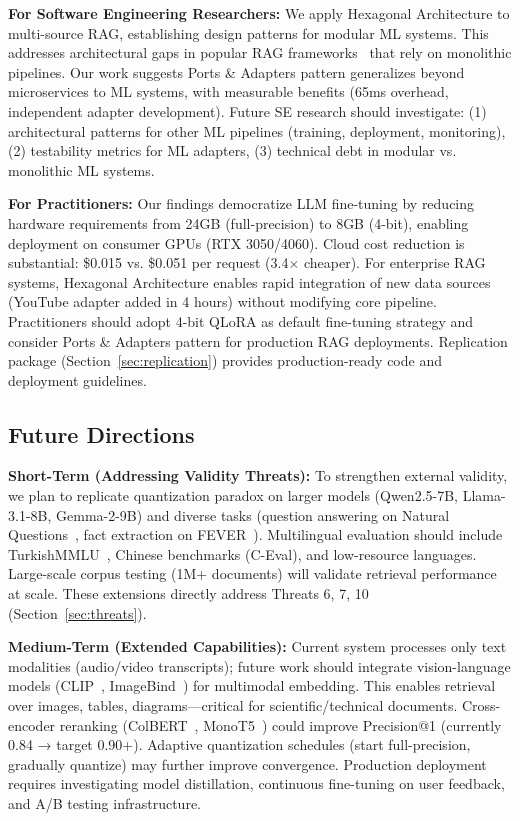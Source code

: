 \documentclass[pdflatex,sn-basic]{sn-jnl}
\begin{document}
\textbf{For Software Engineering Researchers:} We apply Hexagonal Architecture to multi-source RAG, establishing design patterns for modular ML systems. This addresses architectural gaps in popular RAG frameworks~\citep{langchain2023,llamaindex2023} that rely on monolithic pipelines. Our work suggests Ports \& Adapters pattern generalizes beyond microservices to ML systems, with measurable benefits (65ms overhead, independent adapter development). Future SE research should investigate: (1) architectural patterns for other ML pipelines (training, deployment, monitoring), (2) testability metrics for ML adapters, (3) technical debt in modular vs. monolithic ML systems.

\textbf{For Practitioners:} Our findings democratize LLM fine-tuning by reducing hardware requirements from 24GB (full-precision) to 8GB (4-bit), enabling deployment on consumer GPUs (RTX 3050/4060). Cloud cost reduction is substantial: \$0.015 vs. \$0.051 per request (3.4$\times$ cheaper). For enterprise RAG systems, Hexagonal Architecture enables rapid integration of new data sources (YouTube adapter added in 4 hours) without modifying core pipeline. Practitioners should adopt 4-bit QLoRA as default fine-tuning strategy and consider Ports \& Adapters pattern for production RAG deployments. Replication package (Section~\ref{sec:replication}) provides production-ready code and deployment guidelines.

\subsection{Future Directions}
\label{sec:conclusion-future}

\textbf{Short-Term (Addressing Validity Threats):} To strengthen external validity, we plan to replicate quantization paradox on larger models (Qwen2.5-7B, Llama-3.1-8B, Gemma-2-9B) and diverse tasks (question answering on Natural Questions~\citep{kwiatkowski2019natural}, fact extraction on FEVER~\citep{thorne2018fever}). Multilingual evaluation should include TurkishMMLU~\citep{qwen2024technical}, Chinese benchmarks (C-Eval), and low-resource languages. Large-scale corpus testing (1M+ documents) will validate retrieval performance at scale. These extensions directly address Threats 6, 7, 10 (Section~\ref{sec:threats}).

\textbf{Medium-Term (Extended Capabilities):} Current system processes only text modalities (audio/video transcripts); future work should integrate vision-language models (CLIP~\citep{radford2021clip}, ImageBind~\citep{girdhar2023imagebind}) for multimodal embedding. This enables retrieval over images, tables, diagrams—critical for scientific/technical documents. Cross-encoder reranking (ColBERT~\citep{khattab2020colbert}, MonoT5~\citep{nogueira2020monoT5}) could improve Precision@1 (currently 0.84 → target 0.90+). Adaptive quantization schedules (start full-precision, gradually quantize) may further improve convergence. Production deployment requires investigating model distillation, continuous fine-tuning on user feedback, and A/B testing infrastructure.
\end{document}
